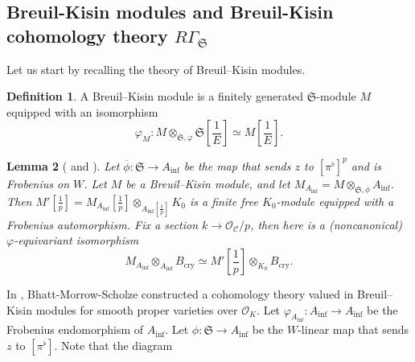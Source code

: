 \documentclass[11pt]{amsart}
\newcommand{\Q}{\mathbb{Q}}
\newcommand{\Z}{\mathbb{Z}}
\newcommand{\sO}{\mathcal{O}}
\newcommand{\et}{{\operatorname{\acute{e}t}}}
\newcommand{\ol}{\overline}
\newcommand{\Bcry}{B_{\operatorname{cry}}}
\newcommand{\Ainf}{A_{\operatorname{inf}}}
\newcommand{\Cu}{\mathcal{C}}
\newcommand{\mS}{\mathfrak{S}}
\newtheorem{lemma}{Lemma}[section]
\newtheorem{cor}[lemma]{Corollary}
\theoremstyle{definition}
\newtheorem{defn}[lemma]{Definition}
\theoremstyle{remark}
\numberwithin{equation}{section}
\begin{document}

\subsection{Breuil-Kisin modules and Breuil-Kisin cohomology theory $R\Gamma_{\mS}$} Let us start by recalling the theory of Breuil–Kisin modules.
\begin{defn}
  A Breuil–Kisin module is a finitely generated $\mS$-module $M$ equipped with an isomorphism
  \[
  \varphi_M:M\otimes_{\mS,\varphi} \mS[\frac{1}{E}] \simeq M[\frac{1}{E}].
  \]
\end{defn}
\begin{lemma}[{\cite[Corollaire 11.1.14]{FarguesFontaine}} and {\cite[Lemma 4.27]{BMS1}}]\label{BKlemma} Let $\ol{\phi}:\mS \to \Ainf$ be the map that sends $z$ to $[\pi^\flat]^p$ and is Frobenius on $W$. Let $M$ be a Breuil–Kisin module, and let $M_{\Ainf}=M\otimes_{\mS,\ol{\phi}}\Ainf$. Then $M'[\frac{1}{p}]=M_{\Ainf}[\frac{1}{p}]\otimes_{\Ainf[\frac{1}{p}]}K_0$ is a finite free $K_0$-module equipped with a Frobenius automorphism. Fix a section $k \to \sO_{\Cu}/p$, then here is a (noncanonical) $\varphi$-equivariant isomorphism
\[
M_{\Ainf}\otimes_{\Ainf}\Bcry \simeq M'[\frac{1}{p}]\otimes_{K_0}\Bcry.
\]
\end{lemma}
In \cite{BMS2}, Bhatt-Morrow-Scholze constructed a cohomology theory valued in Breuil–Kisin modules for smooth proper varieties over $\sO_K$. Let $\varphi_{\Ainf}:\Ainf \to \Ainf$ be the Frobenius endomorphism of $\Ainf$. Let $\phi:\mS \to \Ainf$ be the $W$-linear map that sends $z$ to $[\pi^\flat]$. Note that the diagram 
\end{document}
